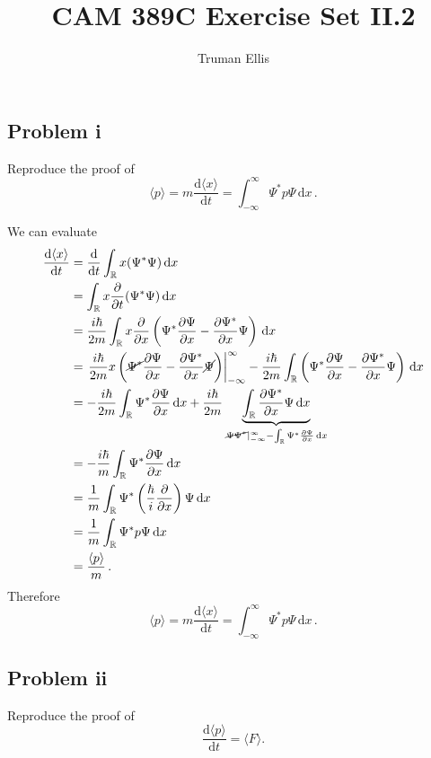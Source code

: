 \documentclass[letterpaper,10pt]{article}
\title{CAM 389C Exercise Set II.2}
\author{Truman Ellis}
\def\expect#1{\langle #1\rangle}
\def\d{\mathrm{d}}
\begin{document}
\maketitle

\subsection*{Problem i}
Reproduce the proof of
\[
\expect{p}=m\frac{\d\expect{x}}{\d t}=\int_{-\infty}^\infty\Psi^*p\Psi\,\d x\,.
\]

We can evaluate
\begin{align*}
\frac{\d\expect{x}}{\d t}&=\frac{\d}{\d t}\int_\mathbb{R}x(\Psi^*\Psi)\,\d x\\
&=\int_\mathbb{R}x\frac{\partial}{\partial t}(\Psi^*\Psi)\,\d x\\
&=\frac{i\hbar}{2m}\int_\mathbb{R}x\frac{\partial}{\partial
x}\left(\Psi^*\frac{\partial\Psi}{\partial x}-\frac{\partial\Psi^*}{\partial
x}\Psi\right)\,\d x\\
&=\left.\frac{i\hbar}{2m}x\left(\cancel{\Psi^*}\frac{\partial\Psi}{\partial x}
-\frac{\partial\Psi^*}{\partial x}\cancel{\Psi}\right)\right|_{-\infty}^\infty
-\frac{i\hbar}{2m}\int_\mathbb{R}\left(\Psi^*\frac{\partial\Psi}{\partial
x}-\frac{\partial\Psi^*}{\partial
x}\Psi\right)\,\d x\\
&=-\frac{i\hbar}{2m}\int_\mathbb{R}\Psi^*\frac{\partial\Psi}{\partial x}\,\d x
+\frac{i\hbar}{2m}
\underbrace{\int_\mathbb{R}\frac{\partial\Psi^*}{\partial x}\Psi\,\d x}
_{\left.\cancel{\Psi\Psi^*}\right|_{-\infty}^\infty
-\int_\mathbb{R}\Psi^*\frac{\partial\Psi}{\partial x}\,\d x}\\
&=-\frac{i\hbar}{m}\int_\mathbb{R}\Psi^*\frac{\partial\Psi}{\partial x}\,\d x\\
&=\frac{1}{m}\int_\mathbb{R}\Psi^*
\left(\frac{\hbar}{i}\frac{\partial}{\partial x}\right)\Psi\,\d x\\
&=\frac{1}{m}\int_\mathbb{R}\Psi^*p\Psi\,\d x\\
&=\frac{\expect{p}}{m}\,.
\end{align*}
Therefore
\[
\expect{p}=m\frac{\d\expect{x}}{\d t}=\int_{-\infty}^\infty\Psi^*p\Psi\,\d x\,.
\]

\subsection*{Problem ii}
Reproduce the proof of
\[
\frac{\d\expect{p}}{\d t}=\expect{F}.
\]
\end{document}
